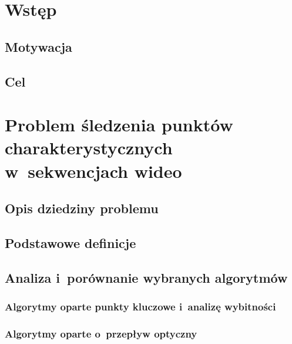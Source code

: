 \chapter{Wstęp}\label{Chapter_Wstep}

  \section{Motywacja}\label{Section_Motywacja}

  \section{Cel}\label{Section_Cel}

\chapter{Problem śledzenia punktów charakterystycznych w~sekwencjach wideo}

  \section{Opis dziedziny problemu}\label{Section_Problematyka}
    \cite{SalientPointsTracking05}
    \cite{GoodFeaturesToTrack94}
    \cite{LucasKanadeTracker81}

  \section{Podstawowe definicje}\label{Section_Definicje}
    \cite{SalientPointsTracking05}
    \cite{GoodFeaturesToTrack94}
    \cite{LucasKanadeTracker81}

  \section{Analiza i~porównanie wybranych algorytmów}\label{Section_Algorytmy}

    \subsection{Algorytmy oparte punkty kluczowe i~analizę wybitności}\label{Subsection_SaliencyKeypoints}
      \cite{SalientPointsTracking05}

    \subsection{Algorytmy oparte o~przepływ optyczny}\label{Subsection_OpticalFlow}

